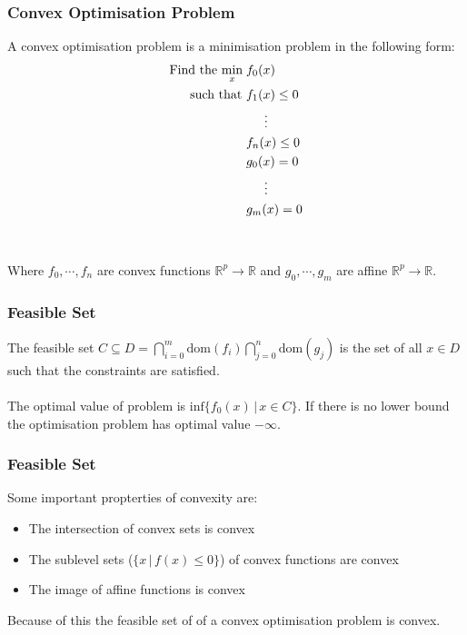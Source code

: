 \documentclass{beamer}
\def\rnum{\mathbb{R}}
\begin{document}
\begin{frame}
    \frametitle{Convex Optimisation Problem}
    A convex optimisation problem is a minimisation problem in the following
    form:
    {\footnotesize
    \begin{align*}
        \text{Find the }\underset{x}{\text{min}}\; &f_{0}(x) \\
        \text{  such that }&f_{1}(x) \leq 0 \\
        & \hspace{5mm} \vdots \\
        &f_{n}(x) \leq 0 \\
        &g_{0}(x) = 0 \\
        &\hspace{5mm} \vdots \\
        &g_{m}(x) = 0
    \end{align*}}
    \\~\\
    Where $f_0,\cdots, f_n$ are convex functions $\rnum^{p} \rightarrow \rnum$ and $g_0, \cdots, g_m$ are
    affine $\rnum^{p} \rightarrow \rnum$.
\end{frame}

\begin{frame}
    \frametitle{Feasible Set}
    The feasible set $C \subseteq D =
    \bigcap\limits_{i=0}^{m}\text{dom}(f_{i})\bigcap\limits_{j=0}^{n}\text{dom}(g_{j})$
    is the set of all $x \in D$ such that the constraints are satisfied.
    \\~\\
    The optimal value of problem is $\text{inf} \{f_{0}(x) \, | \, x
    \in C \}$. If there is no lower bound the optimisation problem has optimal
    value $-\infty$.
\end{frame}

\begin{frame}
    \frametitle{Feasible Set}
    Some important propterties of convexity are:
    \begin{itemize}
        \item The intersection of convex sets is convex
        \item The sublevel sets ($\{x \, | \, f(x) \leq 0 \}$) of convex
            functions are convex
        \item The image of affine functions is convex
    \end{itemize}
    Because of this the feasible set of of a convex optimisation problem is
    convex.
\end{frame}
\end{document}
